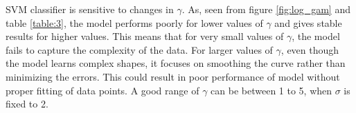 \documentclass[12pt]{report}
\begin{document}
{SVM classifier is sensitive to changes in $\gamma$. As, seen from figure \ref{fig:log_gam} and table \ref{table:3}, the model performs poorly for lower values of $\gamma$ and gives stable results for higher values. This means that for very small values of $\gamma$, the model fails to capture the complexity of the data. For larger values of $\gamma$, even though the model learns complex shapes, it focuses on smoothing the curve rather than minimizing the errors. This could result in poor performance of model without proper fitting of data points. A good range of $\gamma$ can be between 1 to 5, when $\sigma$ is fixed to 2.
 \begin{figure}[!ht]
 	\begin{floatrow}
\end{floatrow}
\end{figure}}
\end{document}
